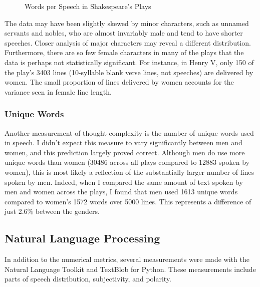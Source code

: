 \documentclass[12pt]{article} %
\begin{document}
\begin{figure}[H] %
\caption{Words per Speech in Shakespeare's Plays}
\label{fig:speciation}
\end{figure}

The data may have been slightly skewed by minor characters, such as unnamed servants and nobles, who are almost invariably male and tend to have shorter speeches. Closer analysis of major characters may reveal a different distribution. Furthermore, there are so few female characters in many of the plays that the data is perhaps not statistically significant. For instance, in Henry V, only 150 of the play's 3403 lines (10-syllable blank verse lines, not speeches) are delivered by women. The small proportion of lines delivered by women accounts for the variance seen in female line length.

\subsubsection{Unique Words}
Another measurement of thought complexity is the number of unique words used in speech. I didn't expect this measure to vary significantly between men and women, and this prediction largely proved correct. Although men do use more unique words than women (30486 across all plays compared to 12883 spoken by women), this is most likely a reflection of the substantially larger number of lines spoken by men. Indeed, when I compared the same amount of text spoken by men and women across the plays, I found that men used 1613 unique words compared to women's 1572 words over 5000 lines. This represents a difference of just 2.6\% between the genders.

\subsection{Natural Language Processing}
In addition to the numerical metrics, several measurements were made with the Natural Language Toolkit and TextBlob for Python. These measurements include parts of speech distribution, subjectivity, and polarity.
\end{document}
